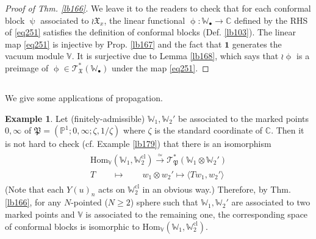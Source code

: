 \documentclass[12pt,a4paper,notitlepage]{article}
\theoremstyle{definition}
\newtheorem{eg}[df]{Example}
\theoremstyle{plain}
\newcommand{\fk}{\mathfrak}
\newcommand{\id}{\mathbf{1}}
\newcommand{\Hom}{\mathrm{Hom}}
\newcommand{\bk}[1]{\langle {#1}\rangle}
\newcommand{\scr}{\mathscr}
\newcommand{\blt}{\bullet}
\newcommand{\Vbb}{\mathbb V}
\newcommand{\Wbb}{\mathbb W}
\newcommand{\Cbb}{\mathbb C}
\newcommand{\Pbb}{\mathbb P}
\newcommand{\cl}{\mathrm{cl}}
\numberwithin{equation}{section}
\begin{document}
\begin{proof}[Proof of Thm. \ref{lb166}]
We leave it to the readers to check that for each conformal block $\uppsi$ associated to $\wr\fk X_x$, the linear functional $\upphi:\Wbb_\blt\rightarrow\Cbb$ defined by the RHS of \eqref{eq251} satisfies the definition of conformal blocks (Def. \ref{lb103}). The linear map \eqref{eq251} is injective by Prop. \ref{lb167} and the fact that $\id$ generates the vacuum module $\Vbb$. It is surjective due to Lemma \ref{lb168}, which says that $\wr\upphi$ is a preimage of $\upphi\in\scr T_{\fk X}^*(\Wbb_\blt)$ under the map \eqref{eq251}.
\end{proof}


\subsection{}\label{lb182}

We give some applications of propagation.
\begin{eg}\label{lb177}
Let (finitely-admissible) $\Wbb_1,\Wbb_2'$ be associated to the marked points $0,\infty$ of $\fk P=(\Pbb^1;0,\infty;\zeta,1/\zeta)$ where $\zeta$ is the standard coordinate of $\Cbb$. Then it is not hard to check (cf. Example \ref{lb179}) that there is an isomorphism
\begin{gather}
\begin{gathered}
\Hom_\Vbb(\Wbb_1,\Wbb_2^\cl)\xrightarrow{\simeq} \scr T_{\fk P}^*(\Wbb_1\otimes\Wbb_2')\\
T\qquad\mapsto\qquad \boxed{w_1\otimes w_2'\mapsto\bk{T w_1,w_2'}}
\end{gathered}
\end{gather}
(Note that each $Y(u)_n$ acts on $\Wbb_2^\cl$ in an obvious way.) Therefore, by Thm. \ref{lb166}, for any $N$-pointed ($N\geq 2$) sphere such that $\Wbb_1,\Wbb_2'$ are associated to two marked points and $\Vbb$ is associated to the remaining one, the corresponding space of conformal blocks is isomorphic to $\Hom_\Vbb(\Wbb_1,\Wbb_2^\cl)$.
\end{eg}
\end{document}
